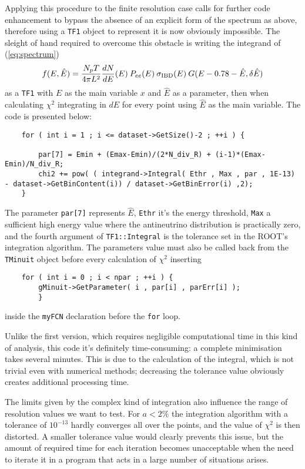 	Applying this procedure to the finite resolution case calls for further code enhancement to bypass the absence of an explicit form of the spectrum as above, therefore using a \texttt{TF1} object to represent it is now obviously impossible. The sleight of hand required to overcome this obstacle is writing the integrand of (\ref{eq:spectrum}) 
	\begin{equation*}
		f(E,\hat{E})=\frac{N_pT}{4\pi L^2}\frac{dN}{dE}(E)\:P_{ee}(E)\:\sigma_\textup{IBD}(E)\:G(E-0.78-\hat{E},\delta \hat{E})
	\end{equation*}
	as a \texttt{TF1} with $E$ as the main variable $x$ and $\hat{E}$ as a parameter, then when calculating $\chi^2$ integrating in $dE$ for every point using $\hat{E}$ as the main variable. The code is presented below:
	\begin{lstlisting}
	for ( int i = 1 ; i <= dataset->GetSize()-2 ; ++i ) {
	
		par[7] = Emin + (Emax-Emin)/(2*N_div_R) + (i-1)*(Emax-Emin)/N_div_R;
		chi2 += pow( ( integrand->Integral( Ethr , Max , par , 1E-13) - dataset->GetBinContent(i)) / dataset->GetBinError(i) ,2);
   	}
	\end{lstlisting}
	The parameter \texttt{par[7]} represents $\hat{E}$, \texttt{Ethr} it's the energy threshold, \texttt{Max} a sufficient high energy value where the antineutrino distribution is practically zero, and the fourth argument of \texttt{TF1::Integral} is the tolerance set in the ROOT's integration algorithm. The parameters value must also be called back from the \texttt{TMinuit} object before every calculation of $\chi^2$ inserting
	\begin{lstlisting}
	for ( int i = 0 ; i < npar ; ++i ) {
		gMinuit->GetParameter( i , par[i] , parErr[i] );
		}	
	\end{lstlisting}
	inside the \texttt{myFCN} declaration before the \texttt{for} loop.
	
	Unlike the first version, which requires negligible computational time in this kind of analysis, this code it's definitely time-consuming: a complete minimisation takes several minutes. This is due to the calculation of the integral, which is not trivial even with numerical methods; decreasing the tolerance value obviously creates additional processing time.
	
	The limits given by the complex kind of integration also influence the range of resolution values we want to test. For $a<2\%$ the integration algorithm with a tolerance of $10^{-13}$ hardly converges all over the points, and the value of $\chi^2$ is then distorted. A smaller tolerance value would clearly prevents this issue, but the amount of required time for each iteration becomes unacceptable when the need to iterate it in a program that acts in a large number of situations arises.	
